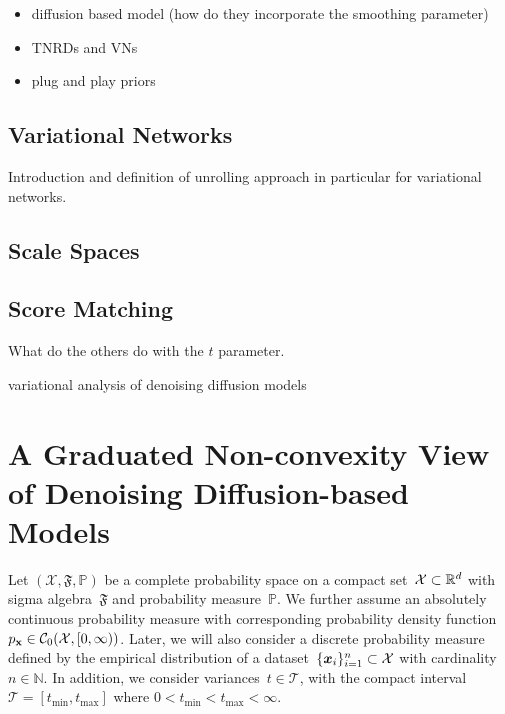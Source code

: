 \documentclass{article} %
\theoremstyle{plain}
\theoremstyle{definition}
\theoremstyle{remark}
\newcommand{\N}{\mathbb{N}}
\renewcommand{\P}{\mathbb{P}}
\newcommand{\C}{\mathcal{C}}
\newcommand{\X}{\mathcal{X}}
\newcommand{\T}{\mathcal{T}}
\newcommand{\tmin}{t_\mathrm{min}}
\newcommand{\tmax}{t_\mathrm{max}}
\newcommand{\pdf}[1]{p_{#1}}
\begin{document}
\begin{itemize}
    \item diffusion based model (how do they incorporate the smoothing parameter)
    \item TNRDs and VNs
    \item plug and play priors
\end{itemize}

\subsection{Variational Networks}
Introduction and definition of unrolling approach in particular for variational networks.

\subsection{Scale Spaces}

\subsection{Score Matching}

What do the others do with the $t$ parameter.

variational analysis of denoising diffusion models~\cite{HuLi21}

\section{A Graduated Non-convexity View of Denoising Diffusion-based Models} \label{sec:gnc}
Let $(\X,\mathfrak{F},\P)$ be a complete probability space on a compact set~$\X\subset\R^d$ with sigma algebra~$\mathfrak{F}$ and probability measure~$\P$.
We further assume an absolutely continuous probability measure with corresponding probability density function~$\pdf{\rvx}\in \C_0(\X,[0,\infty))$.
Later, we will also consider a discrete probability measure defined by the empirical distribution of a dataset~$\{\vx_i\}_{i=1}^n\subset\X$ with cardinality~$n\in\N$.
In addition, we consider variances~$t\in\T$, with the compact interval~$\T=[\tmin,\tmax]$ where $0<\tmin<\tmax<\infty$.
\end{document}
